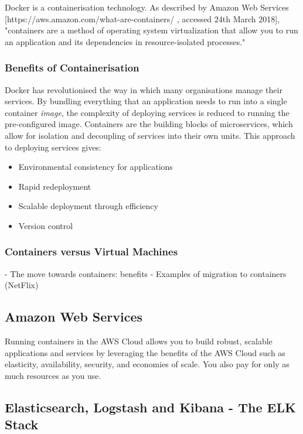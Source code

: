Docker is a containerisation technology. As described by Amazon Web Services [https://aws.amazon.com/what-are-containers/ , accessed 24th March 2018], "containers are a method of operating system virtualization that allow you to run an application and its dependencies in resource-isolated processes."

\subsubsection{Benefits of Containerisation}

Docker has revolutionised the way in which many organisations manage their services. By bundling everything that an application needs to run into a single container \textit{image}, the complexity of deploying services is reduced to running the pre-configured image. Containers are the building blocks of microservices, which allow for isolation and decoupling of services into their own units. This approach to deploying services gives:


\begin{itemize}
	\item Environmental consistency for applications
	\item Rapid redeployment
	\item Scalable deployment through efficiency
	\item Version control
\end{itemize}

\subsubsection{Containers versus Virtual Machines}


- The move towards containers: benefits
- Examples of migration to containers (NetFlix)

\subsection{Amazon Web Services}
Running containers in the AWS Cloud allows you to build robust, scalable applications and services by leveraging the benefits of the AWS Cloud such as elasticity, availability, security, and economies of scale. You also pay for only as much resources as you use.


\subsection{Elasticsearch, Logstash and Kibana - The ELK Stack}


